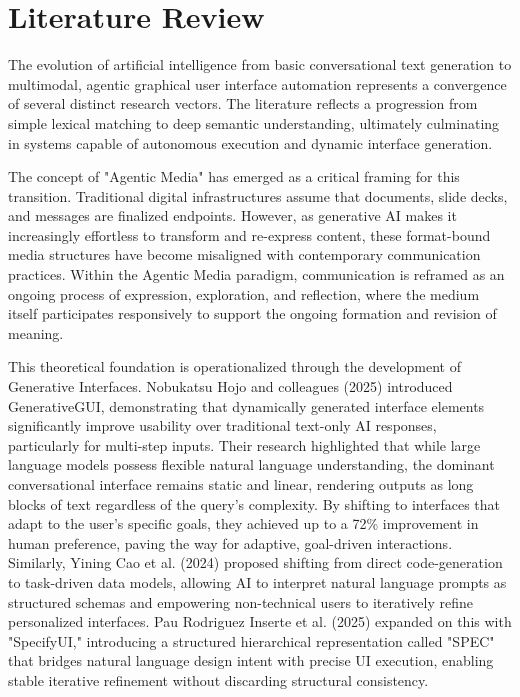 \documentclass[12pt, a4paper]{report}
\begin{document}
\section{Literature Review}
The evolution of artificial intelligence from basic conversational text generation to multimodal, agentic graphical user interface automation represents a convergence of several distinct research vectors. The literature reflects a progression from simple lexical matching to deep semantic understanding, ultimately culminating in systems capable of autonomous execution and dynamic interface generation.

The concept of "Agentic Media" has emerged as a critical framing for this transition. Traditional digital infrastructures assume that documents, slide decks, and messages are finalized endpoints.\cite{microsoft2026} However, as generative AI makes it increasingly effortless to transform and re-express content, these format-bound media structures have become misaligned with contemporary communication practices.\cite{microsoft2026} Within the Agentic Media paradigm, communication is reframed as an ongoing process of expression, exploration, and reflection, where the medium itself participates responsively to support the ongoing formation and revision of meaning.\cite{microsoft2026}

This theoretical foundation is operationalized through the development of Generative Interfaces. Nobukatsu Hojo and colleagues (2025) introduced GenerativeGUI, demonstrating that dynamically generated interface elements significantly improve usability over traditional text-only AI responses, particularly for multi-step inputs.\cite{hojo2025} Their research highlighted that while large language models possess flexible natural language understanding, the dominant conversational interface remains static and linear, rendering outputs as long blocks of text regardless of the query's complexity.\cite{arxiv2508} By shifting to interfaces that adapt to the user's specific goals, they achieved up to a 72\% improvement in human preference, paving the way for adaptive, goal-driven interactions.\cite{arxiv2508} Similarly, Yining Cao et al. (2024) proposed shifting from direct code-generation to task-driven data models, allowing AI to interpret natural language prompts as structured schemas and empowering non-technical users to iteratively refine personalized interfaces.\cite{hojo2025} Pau Rodriguez Inserte et al. (2025) expanded on this with "SpecifyUI," introducing a structured hierarchical representation called "SPEC" that bridges natural language design intent with precise UI execution, enabling stable iterative refinement without discarding structural consistency.\cite{hojo2025}
\end{document}
